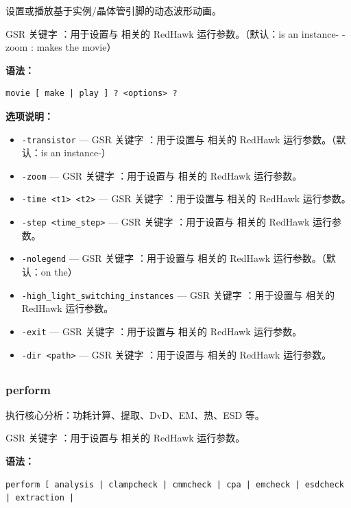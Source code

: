设置或播放基于实例/晶体管引脚的动态波形动画。

GSR 关键字 ：用于设置与  相关的 RedHawk 运行参数。（默认：is an instance-
-zoom : makes the movie）

\textbf{语法：}
\begin{lstlisting}
movie [ make | play ] ? <options> ?
\end{lstlisting}

\textbf{选项说明：}
\begin{itemize}
\item \texttt{-transistor} — GSR 关键字 ：用于设置与  相关的 RedHawk 运行参数。（默认：is an instance-）
\item \texttt{-zoom} — GSR 关键字 ：用于设置与  相关的 RedHawk 运行参数。
\item \texttt{-time <t1> <t2>} — GSR 关键字 ：用于设置与  相关的 RedHawk 运行参数。
\item \texttt{-step <time\_step>} — GSR 关键字 ：用于设置与  相关的 RedHawk 运行参数。
\item \texttt{-nolegend} — GSR 关键字 ：用于设置与  相关的 RedHawk 运行参数。（默认：on the）
\item \texttt{-high\_light\_switching\_instances} — GSR 关键字 ：用于设置与  相关的 RedHawk 运行参数。
\item \texttt{-exit} — GSR 关键字 ：用于设置与  相关的 RedHawk 运行参数。
\item \texttt{-dir <path>} — GSR 关键字 ：用于设置与  相关的 RedHawk 运行参数。
\end{itemize}

\subsection{}
\subsubsection*{perform}

执行核心分析：功耗计算、提取、DvD、EM、热、ESD 等。

GSR 关键字 ：用于设置与  相关的 RedHawk 运行参数。

\textbf{语法：}
\begin{lstlisting}
perform [ analysis | clampcheck | cmmcheck | cpa | emcheck | esdcheck | extraction |
\end{lstlisting}

